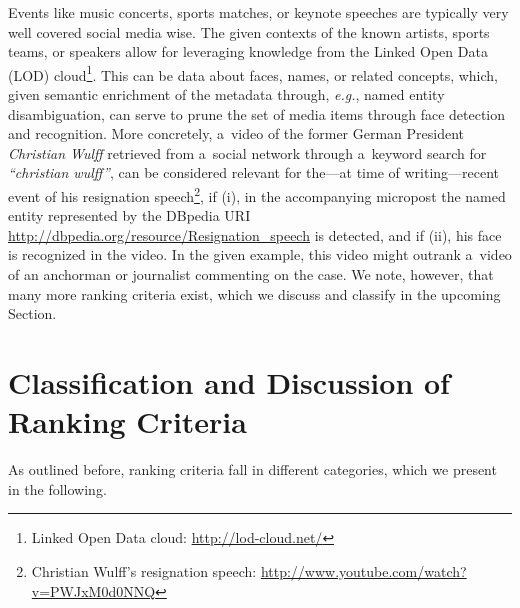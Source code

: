 \documentclass[runningheads,a4paper,11pt]{llncs}
\begin{document}
Events like music concerts, sports matches, or keynote speeches
are typically very well covered social media wise.
The given contexts of the known artists, sports teams, or speakers
allow for leveraging knowledge from the
Linked Open Data (LOD) cloud\footnote{Linked Open Data cloud: \url{http://lod-cloud.net/}}.
This can be data about faces, names, or related concepts,
which, given semantic enrichment of the metadata through, \emph{e.g.},
named entity disambiguation, can serve to prune the set of media items
through face detection and recognition.
More concretely, a~video of the former German President \emph{Christian Wulff}
retrieved from a~social network through a~keyword search for \emph{``christian wulff''},
can be considered relevant for the---at time of writing---recent
event of his resignation speech\footnote{Christian Wulff's resignation speech:
\url{http://www.youtube.com/watch?v=PWJxM0d0NNQ}},
if (i), in the accompanying micropost the named entity represented by the DBpedia URI
\url{http://dbpedia.org/resource/Resignation_speech} is detected,
and if (ii), his face is recognized in the video.
In the given example, this video might outrank a~video
of an anchorman or journalist commenting on the case.
We note, however, that many more ranking criteria exist,
which we discuss and classify in the upcoming Section.

\section{Classification and Discussion of Ranking Criteria}
As outlined before, ranking criteria fall in different categories,
which we present in the following.
\end{document}
